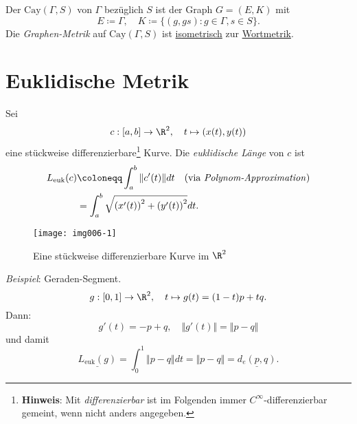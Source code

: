\begin{definition}
  Der  $ \text{Cay}(\Gamma, S) $ von $ \Gamma $ bezüglich $ S $ ist der Graph $ G = (E, K) $ mit
  \begin{equation*}
    E \coloneqq \Gamma, \quad K \coloneqq \{ (g, gs) : g \in \Gamma, s \in S \}\text{.}
  \end{equation*}
  Die \emph{Graphen-Metrik} auf $ \text{Cay}(\Gamma, S) $ ist \hyperref[def:isometrie]{isometrisch} zur \hyperref[def:wortmetrik]{Wortmetrik}.
\end{definition}

\section{Euklidische Metrik}
\begin{example}
  Sei
  \begin{equation*}
    c : [a,b] \to \R^2, \quad t \mapsto (x(t), y(t))
  \end{equation*}
  eine stückweise differenzierbare\footnote{\textbf{Hinweis}: Mit \emph{differenzierbar} ist im Folgenden immer $ C^\infty $-differenzierbar gemeint, wenn nicht anders angegeben.} Kurve.
  Die \emph{euklidische Länge} von $ c $ ist
  \begin{align*}
    L_{\text{euk}}(c) &\coloneqq \int_a^b \Vert c'(t) \Vert dt \quad \text{(via \emph{Polynom-Approximation})} \\
     &= \int_a^b \sqrt{\left( x'(t) \right)^2 + \left( y'(t) \right)^2}dt\text{.}
  \end{align*}
  \begin{figure}[H]
    \label{img006-1}
    \texttt{[image: img006-1]}
    \caption{Eine stückweise differenzierbare Kurve im $ \R^2 $}
  \end{figure}
  \emph{Beispiel}: Geraden-Segment.
  \begin{equation*}
    g: [0,1] \to \R^2, \quad t \mapsto g(t) = (1-t)p + tq\text{.}
  \end{equation*}
  Dann:
  \begin{equation*}
    g'(t) = -p+q, \quad \Vert g'(t) \Vert = \Vert p - q \Vert
  \end{equation*}
  und damit
  \begin{equation*}
    \underline{L_{\text{euk}}(g)} = \int_0^1\Vert p - q \Vert dt = \Vert p - q \Vert = \underline{d_e(p,q)}\text{.}
  \end{equation*}
\end{example}

